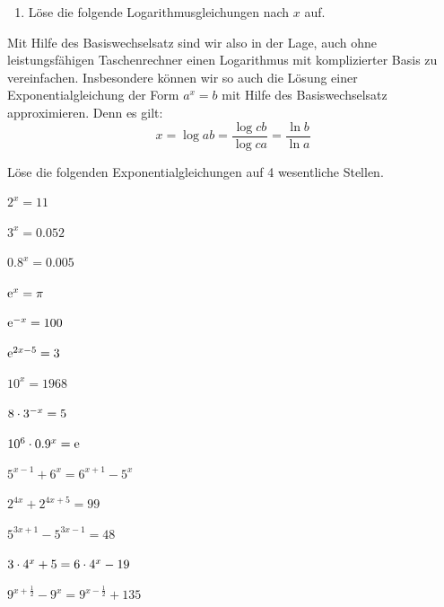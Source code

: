 \documentclass[11pt,oneside]{article}
\begin{document}
\begin{aufgabe}
\begin{enumerate}
			\item Löse die folgende Logarithmusgleichungen nach $x$ auf.
		\end{enumerate}
	\end{aufgabe}
	Mit Hilfe des Basiswechselsatz sind wir also in der Lage, auch ohne leistungsfähigen Taschenrechner einen Logarithmus mit komplizierter Basis zu vereinfachen. Insbesondere können wir so auch die Lösung einer Exponentialgleichung der Form $a^x=b$ mit Hilfe des Basiswechselsatz approximieren. Denn es gilt:
	\[x=\log{a}{b}=\frac{\log{c}{b}}{\log{c}{a}}=\frac{\ln{b}}{\ln{a}}\]\newpage
	\begin{aufgabe}
		Löse die folgenden Exponentialgleichungen auf 4 wesentliche Stellen.
		\begin{enumcols}[3]
			\item $2^x=11$
			\item $3^x=0.052$
			\item $0.8^x=0.005$
			\item $\operatorname{e}^x=\pi$
			\item $\operatorname{e}^{-x}=100$
			\item $\operatorname{e}^{2x-5}=3$
			\item $10^x=1968$
			\item $8\cdot3^{-x}=5$
			\item $10^6\cdot0.9^x=\operatorname{e}$
			\item $5^{x-1}+6^x=6^{x+1}-5^x$
			\item $2^{4x}+2^{4x+5}=99$
			\item $5^{3x+1}-5^{3x-1}=48$
			\item $3\cdot4^x+5=6\cdot4^x-19$
			\item $9^{x+\frac{1}{2}}-9^x=9^{x-\frac{1}{2}}+135$
		\end{enumcols}
	\end{aufgabe}
\end{document}
